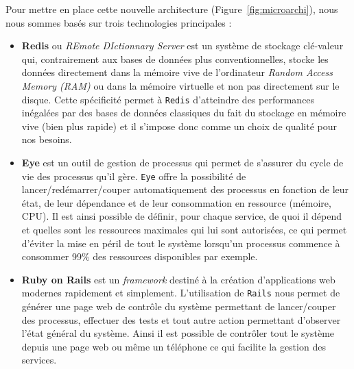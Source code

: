 Pour mettre en place cette nouvelle architecture (Figure~\ref{fig:microarchi}), nous nous sommes basés sur trois technologies principales :
\begin{itemize}
\item \textbf{Redis}\cite{redis} ou \emph{REmote DIctionnary Server} est un système de stockage clé-valeur qui, contrairement aux bases de données plus conventionnelles, stocke les données directement dans la mémoire vive de l'ordinateur \emph{Random Access Memory (RAM)} ou dans la mémoire virtuelle et non pas directement sur le disque. Cette spécificité permet à \texttt{Redis} d'atteindre des performances inégalées par des bases de données classiques du fait du stockage en mémoire vive (bien plus rapide) et il s'impose donc comme un choix de qualité pour nos besoins.
\item \textbf{Eye}\cite{eye} est un outil de gestion de processus qui permet de s'assurer du cycle de vie des processus qu'il gère. \texttt{Eye} offre la possibilité de lancer/redémarrer/couper automatiquement des processus en fonction de leur état, de leur dépendance et de leur consommation en ressource (mémoire, CPU). Il est ainsi possible de définir, pour chaque service, de quoi il dépend et quelles sont les ressources maximales qui lui sont autorisées, ce qui permet d'éviter la mise en péril de tout le système lorsqu'un processus commence à consommer 99\% des ressources disponibles par exemple.
\item \textbf{Ruby on Rails}\cite{rubyrails} est un \emph{framework} destiné à la création d'applications web modernes rapidement et simplement. L'utilisation de \texttt{Rails} nous permet de générer une page web de contrôle du système permettant de lancer/couper des processus, effectuer des tests et tout autre action permettant d'observer l'état général du système. Ainsi il est possible de contrôler tout le système depuis une page web ou même un téléphone ce qui facilite la gestion des services.\\
\end{itemize}

